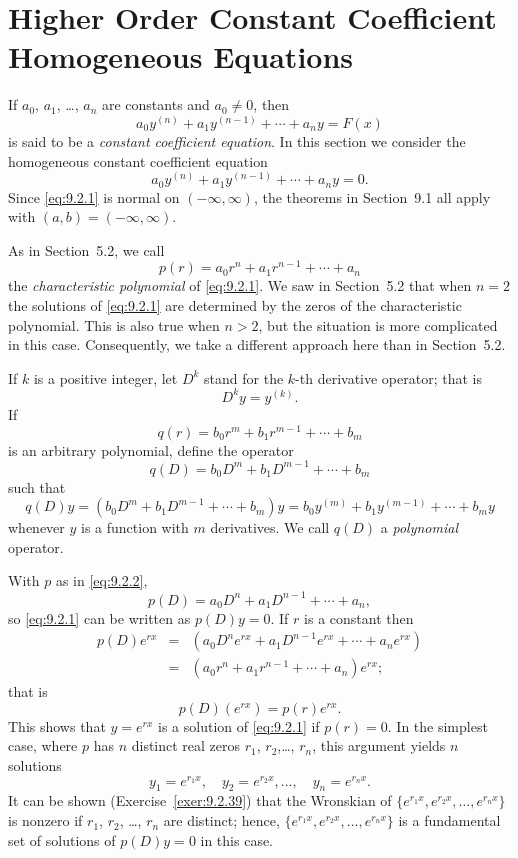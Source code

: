 \section{Higher Order Constant Coefficient Homogeneous Equations}

\noindent
If $a_{0}$, $a_{1}$, \dots, $a_{n}$ are constants and $a_{0}\ne0$, then
\[
  a_{0}y^{(n)}+a_{1}y^{(n-1)}+\cdots+a_{n}y=F(x)
\]
is said to be a {\color{blue}\it constant coefficient equation\/}. In this section we consider the
homogeneous constant coefficient equation
\begin{equation}
  \label{eq:9.2.1}a_{0}y^{(n)}+a_{1}y^{(n-1)}+\cdots+a_{n}y=0.
\end{equation}
Since \eqref{eq:9.2.1} is normal on $(-\infty,\infty)$, the theorems in Section~9.1 all apply with
$(a,b)=(-\infty,\infty)$.

As in Section~5.2, we call
\begin{equation}
  \label{eq:9.2.2}p(r)=a_{0}r^{n}+a_{1}r^{n-1}+\cdots+a_{n}
\end{equation}
the {\color{blue}\it characteristic polynomial\/} of \eqref{eq:9.2.1}. We saw in Section~5.2 that
when $n=2$ the solutions of \eqref{eq:9.2.1} are determined by the zeros of the characteristic
polynomial. This is also true when $n>2$, but the situation is more complicated in this case.
Consequently, we take a different approach here than in Section~5.2.

If $k$ is a positive integer, let $D^{k}$ stand for the $k$-th derivative operator; that is
\[
  D^{k}y=y^{(k)}.
\]
If
\[
  q(r)=b_{0}r^{m}+b_{1}r^{m-1}+\cdots+b_{m}
\]
is an arbitrary polynomial, define the operator
\[
  q(D)=b_{0}D^{m}+b_{1}D^{m-1}+\cdots+b_{m}
\]
such that
\[
  q(D)y=(b_{0}D^{m}+b_{1}D^{m-1}+\cdots+b_{m})y=b_{0}y^{(m)}+b_{1}y^{(m-1)}+\cdots+ b_{m}y
\]
whenever $y$ is a function with $m$ derivatives. We call $q(D)$ a {\color{blue}\it polynomial\/}
operator.

With $p$ as in \eqref{eq:9.2.2},
\[
  p(D)=a_{0}D^{n}+a_{1}D^{n-1}+\cdots+a_{n},
\]
so \eqref{eq:9.2.1} can be written as $p(D)y=0$. If $r$ is a constant then
\begin{eqnarray*}
  p(D)e^{rx} & = & \left(a_{0}D^{n}e^{rx}+a_{1}D^{n-1}e^{rx}+\cdots+a_{n}e^{rx}\right) \\
             & = & (a_{0}r^{n}+a_{1}r^{n-1}+\cdots+a_{n})e^{rx};
\end{eqnarray*}
that is
\[
  p(D)(e^{rx})=p(r)e^{rx}.
\]
This shows that $y=e^{rx}$ is a solution of \eqref{eq:9.2.1} if $p(r)=0$. In the simplest case,
where $p$ has $n$ distinct real zeros $r_{1}$, $r_{2}$,\dots, $r_{n}$, this argument yields $n$
solutions
\[
  y_{1}=e^{r_{1}x},\quad y_{2}=e^{r_{2}x},\dots,\quad y_{n}=e^{r_{n}x}.
\]
It can be shown (Exercise~\ref{exer:9.2.39}) that the Wronskian of
$\{e^{r_{1}x},e^{r_{2}x},\dots,e^{r_{n}x}\}$ is nonzero if $r_{1}$, $r_{2}$, \dots, $r_{n}$ are
distinct; hence, $\{e^{r_{1}x},e^{r_{2}x},\dots,e^{r_{n}x}\}$ is a fundamental set of solutions of
$p(D)y=0$ in this case.

